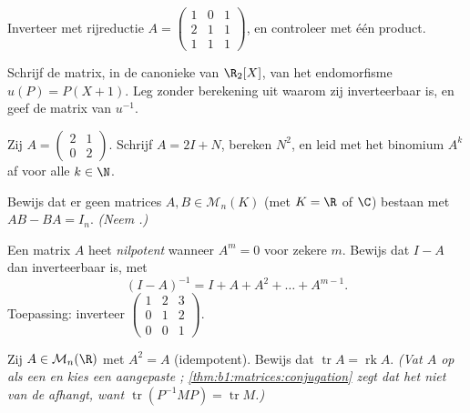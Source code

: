 \begin{exercise}[$\star$]\label{exo:b1:matrices:3}
Inverteer met rijreductie $A = \begin{pmatrix} 1 & 0 & 1\\ 2 & 1 &
1\\ 1 & 1 & 1 \end{pmatrix}$, en controleer met één product.
\end{exercise}

\begin{exercise}[$\star$]\label{exo:b1:matrices:4}
Schrijf de matrix, in de canonieke  van $\R_2[X]$, van het
endomorfisme $u(P) = P(X + 1)$. Leg zonder berekening uit waarom
zij inverteerbaar is, en geef de matrix van $u^{-1}$.
\end{exercise}

\begin{exercise}[$\star\star$]\label{exo:b1:matrices:5}
Zij $A = \begin{pmatrix} 2 & 1 \\ 0 & 2\end{pmatrix}$. Schrijf $A =
2I + N$, bereken $N^2$, en leid met het binomium $A^k$ af voor alle
$k \in \N$.
\end{exercise}

\begin{exercise}[$\star\star$]\label{exo:b1:matrices:6}
Bewijs dat er geen matrices $A, B \in \mathcal{M}_n(K)$ (met $K =
\R$ of $\C$) bestaan met $AB - BA = I_n$. \emph{(Neem .)}
\end{exercise}

\begin{exercise}[$\star\star$]\label{exo:b1:matrices:7}
Een matrix $A$ heet \emph{nilpotent} wanneer $A^m = 0$ voor zekere
$m$. Bewijs dat $I - A$ dan inverteerbaar is, met
\[
(I - A)^{-1} = I + A + A^2 + \dots + A^{m-1} .
\]
Toepassing: inverteer $\begin{pmatrix} 1 & 2 & 3\\ 0 & 1 & 2\\ 0 &
0 & 1\end{pmatrix}$.
\end{exercise}

\begin{exercise}[$\star\star$]\label{exo:b1:matrices:8}
Zij $A \in \mathcal{M}_n(\R)$ met $A^2 = A$ (idempotent). Bewijs
dat $\operatorname{tr} A = \operatorname{rk} A$. \emph{(Vat $A$ op
als een  en kies een aangepaste ;
\cref{thm:b1:matrices:conjugation} zegt dat het  niet van de
 afhangt, want $\operatorname{tr}(P^{-1}MP) =
\operatorname{tr} M$.)}
\end{exercise}

